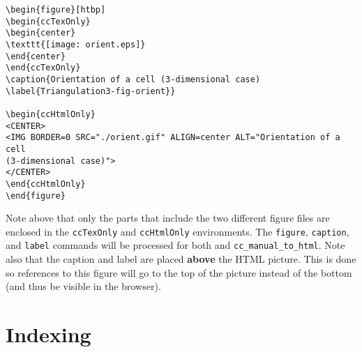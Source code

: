\begin{verbatim}
\begin{figure}[htbp]
\begin{ccTexOnly}
\begin{center}
\texttt{[image: orient.eps]}
\end{center}
\end{ccTexOnly}
\caption{Orientation of a cell (3-dimensional case)
\label{Triangulation3-fig-orient}}

\begin{ccHtmlOnly}
<CENTER>
<IMG BORDER=0 SRC="./orient.gif" ALIGN=center ALT="Orientation of a cell
(3-dimensional case)">
</CENTER>
\end{ccHtmlOnly}
\end{figure}
\end{verbatim}

Note above that only the parts that include the two different figure files
are enclosed in the {\tt ccTexOnly} and {\tt ccHtmlOnly} environments.
The {\tt figure}, {\tt caption}, and {\tt label} commands will be processed
for both  and {\tt cc\_manual\_to\_html}.
Note also that the caption and label are placed {\bf above} the HTML picture.  
This is done so references to this figure will go to the top of the picture
instead of the bottom (and thus be visible in the browser).


\section{Indexing}
\label{sec:indexing}

